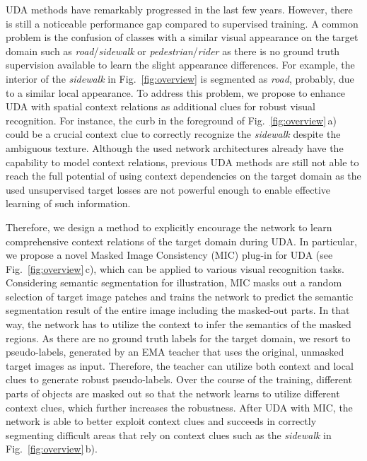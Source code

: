 \documentclass[10pt,twocolumn,letterpaper]{article}
\begin{document}
UDA methods have remarkably progressed in the last few years. However, there is still a noticeable performance gap compared to supervised training. 
A common problem is the confusion of classes with a similar visual appearance on the target domain such as \emph{road}/\emph{sidewalk} or \emph{pedestrian}/\emph{rider} as there is no ground truth supervision available to learn the slight appearance differences. 
For example, the interior of the \emph{sidewalk} in Fig.~\ref{fig:overview} is segmented as \emph{road}, probably, due to a similar local appearance.
To address this problem, we propose to enhance UDA with spatial context relations as additional clues for robust visual recognition. For instance, the curb in the foreground of Fig.~\ref{fig:overview}\,a) could be a crucial context clue to correctly recognize the \emph{sidewalk} despite the ambiguous texture.
Although the used network architectures already have the capability to model context relations, previous UDA methods are still not able to reach the full potential of using context dependencies on the target domain as
the used unsupervised target losses are not powerful enough to enable effective learning of such information.








Therefore, we design a method to explicitly encourage the network to learn comprehensive context relations of the target domain during UDA.
In particular, we propose a novel Masked Image Consistency (MIC) plug-in for UDA (see Fig.~\ref{fig:overview}\,c), which can be applied to various visual recognition tasks. Considering semantic segmentation for illustration, MIC masks out a random selection of target image patches and trains the network to predict the semantic segmentation result of the entire image including the masked-out parts.
In that way, the network has to utilize the context to infer the semantics of the masked regions. As there are no ground truth labels for the target domain, we resort to pseudo-labels, generated by an EMA teacher that uses the original, unmasked target images as input. Therefore, the teacher can utilize both context and local clues to generate robust pseudo-labels. Over the course of the training, different parts of objects are masked out so that the network learns to utilize different context clues, which further increases the robustness. After UDA with MIC, the network is able to better exploit context clues and succeeds in correctly segmenting difficult areas that rely on context clues such as the \emph{sidewalk} in Fig.~\ref{fig:overview}\,b).
\end{document}
